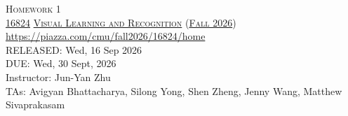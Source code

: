\documentclass[11pt,addpoints,answers]{exam}
\title{\textsc{\hwName}} %
\author{}
\date{}
\date{}
\numberwithin{equation}{section} %
\numberwithin{figure}{section} %
\numberwithin{table}{section} %
\newcommand{\courseNum}{\href{https://visual-learning.cs.cmu.edu/}{16824}}
\newcommand{\courseName}{\href{https://visual-learning.cs.cmu.edu/}{Visual Learning and Recognition}}
\newcommand{\courseSem}{\href{https://visual-learning.cs.cmu.edu/}{Fall 2026}}
\newcommand{\courseUrl}{{\url{https://piazza.com/cmu/fall2026/16824/home}}}
\newcommand{\hwNum}{Homework 1}
\newcommand{\hwTopic}{Image Classification and Object Detection}
\newcommand{\outDate}{{Wed, 16 Sep 2026}}
\newcommand{\dueDate}{{Wed, 30 Sept, 2026}}
\newcommand{\instructorName}{{Jun-Yan Zhu}}
\newcommand{\taNames}{{Avigyan Bhattacharya, Silong Yong, Shen Zheng, Jenny Wang, Matthew Sivaprakasam}}
\begin{document}
\section*{}
\begin{center}
  \textsc{\LARGE \hwNum} \\
  \vspace{1em}
  \textsc{\large \courseNum{} \courseName{} (\courseSem)} \\
  \courseUrl\\
  \vspace{1em}
  RELEASED: \outDate \\
  DUE: \dueDate \\
  Instructor: \instructorName \\
  TAs: \taNames
\end{center}
\end{document}
